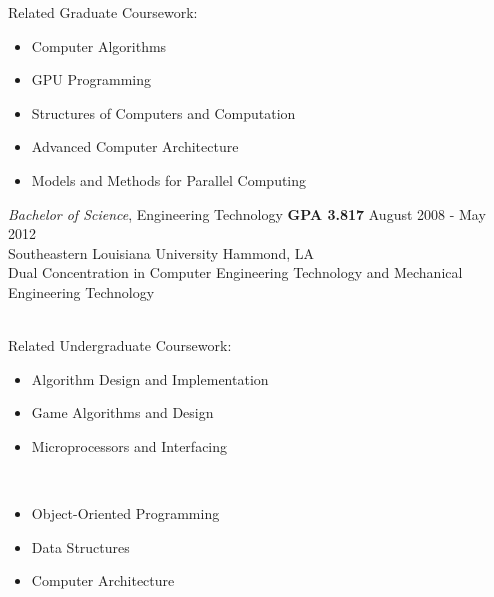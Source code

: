 \documentclass{res}
\begin{document}
\begin{resume}
\begin{multicols}{2}
{		Related Graduate Coursework:  \vspace{-0.175in}
		\begin{itemize}
			\item Computer Algorithms
			\item GPU Programming
			\item Structures of Computers and Computation
			\item Advanced Computer Architecture
			\item Models and Methods for Parallel Computing
			\end{itemize}
	}
	\end{multicols}

	{\sl Bachelor of Science}, Engineering Technology {\bf GPA 3.817} \hfill August 2008 - May 2012\\
	Southeastern Louisiana University \hfill Hammond, LA\\
	{\footnotesize Dual Concentration in Computer Engineering Technology and Mechanical Engineering Technology}\\\\
		\vspace{-0.49in}
		\begin{multicols}{2}
			{\footnotesize 
				Related Undergraduate Coursework: \vspace{-0.175in}
				\begin{itemize}
					\item Algorithm Design and Implementation
					\item Game Algorithms and Design
					\item Microprocessors and Interfacing 
				\end{itemize} 
				\ %
				\vspace{-0.175in}
				\begin{itemize}
					\item Object-Oriented Programming
					\item Data Structures
					\item Computer Architecture 
				\end{itemize}
			}
		\end{multicols}
		
	

\end{resume}
\end{document}
